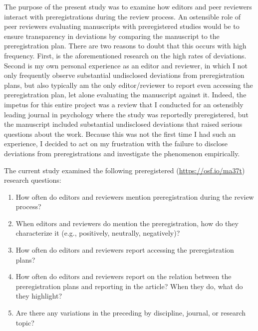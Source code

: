 \documentclass[authordate, meta]{jote-new-article}
\begin{document}
	The purpose of the present study was to examine how editors and peer reviewers interact with preregistrations during the review process. An ostensible role of peer reviewers evaluating manuscripts with preregistered studies would be to ensure transparency in deviations by comparing the manuscript to the preregistration plan. There are two reasons to doubt that this occurs with high frequency. First, is the aforementioned research on the high rates of deviations. Second is my own personal experience as an editor and reviewer, in which I not only frequently observe substantial undisclosed deviations from preregistration plans, but also typically am the only editor/reviewer to report even accessing the preregistration plan, let alone evaluating the manuscript against it. Indeed, the impetus for this entire project was a review that I conducted for an ostensibly leading journal in psychology where the study was reportedly preregistered, but the manuscript included substantial undisclosed deviations that raised serious questions about the work. Because this was not the first time I had such an experience, I decided to act on my frustration with the failure to disclose deviations from preregistrations and investigate the phenomenon empirically.



	The current study examined the following preregistered (\url{https://osf.io/ma37t}) research questions:

	\begin{enumerate}


		\item How often do editors and reviewers mention preregistration during the review process?



		\item
		When editors and reviewers do mention the preregistration, how do they characterize it (e.g., positively, neutrally, negatively)?



		\item How often do editors and reviewers report accessing the preregistration plans?



		\item
		How often do editors and reviewers report on the relation between the preregistration plans and reporting in the article? When they do, what do they highlight?



		\item Are there any variations in the preceding by discipline, journal, or research topic?


	\end{enumerate}
\end{document}
